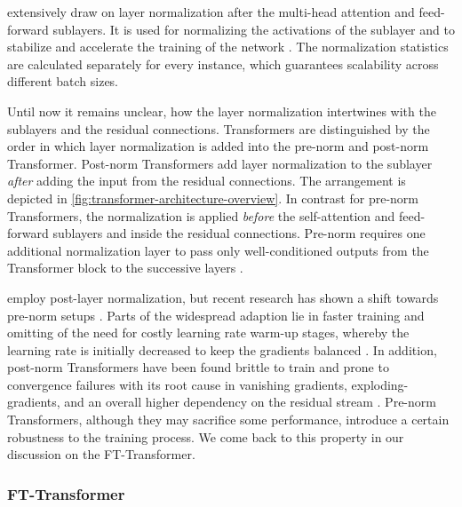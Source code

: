 \textcite[][3]{vaswaniAttentionAllYou2017} extensively draw on layer normalization \autocite[][4]{baLayerNormalization2016} after the multi-head attention and feed-forward sublayers. It is used for normalizing the activations of the sublayer and to stabilize and accelerate the training of the network \autocite[][2]{baLayerNormalization2016}. The normalization statistics are calculated separately for every instance, which guarantees scalability across different batch sizes.

Until now it remains unclear, how the layer normalization intertwines with the sublayers and the residual connections. Transformers are distinguished by the order in which layer normalization is added into the pre-norm and post-norm Transformer. Post-norm Transformers add layer normalization to the sublayer \emph{after} adding the input from the residual connections. The arrangement is depicted in \cref{fig:transformer-architecture-overview}. In contrast for pre-norm Transformers, the normalization is applied \emph{before} the self-attention and feed-forward sublayers and inside the residual connections. Pre-norm requires one additional normalization layer to pass only well-conditioned outputs from the Transformer block to the successive layers \autocite[][5]{xiongLayerNormalizationTransformer2020}.

\textcite[][3]{vaswaniAttentionAllYou2017} employ post-layer normalization, but recent research has shown a shift towards pre-norm setups \autocite[][4]{narangTransformerModificationsTransfer2021}. Parts of the widespread adaption lie in faster training and omitting of the need for costly learning rate warm-up stages, whereby the learning rate is initially decreased to keep the gradients balanced \autocites[][2]{xiongLayerNormalizationTransformer2020}[][8]{liuUnderstandingDifficultyTraining2020}. In addition, post-norm Transformers have been found brittle to train and prone to convergence failures with its root cause in vanishing gradients, \glspl{exploding-gradient}, and an overall higher dependency on the residual stream \autocites[][8]{liuUnderstandingDifficultyTraining2020}[][1812]{wangLearningDeepTransformer2019}. Pre-norm Transformers, although they may sacrifice some performance, introduce a certain robustness to the training process. We come back to this property in our discussion on the FT-Transformer.

\subsubsection{FT-Transformer}\label{sec:fttransformer}

